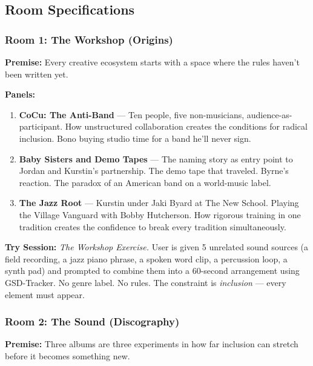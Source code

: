 \documentclass[11pt,letterpaper]{article}
\begin{document}
\subsection{Room Specifications}

\subsubsection{Room 1: The Workshop (Origins)}

\textbf{Premise:} Every creative ecosystem starts with a space where the rules haven't been written yet.

\textbf{Panels:}
\begin{enumerate}[leftmargin=2em]
\item \textbf{CoCu: The Anti-Band} --- Ten people, five non-musicians, audience-as-participant. How unstructured collaboration creates the conditions for radical inclusion. Bono buying studio time for a band he'll never sign.
\item \textbf{Baby Sisters and Demo Tapes} --- The naming story as entry point to Jordan and Kurstin's partnership. The demo tape that traveled. Byrne's reaction. The paradox of an American band on a world-music label.
\item \textbf{The Jazz Root} --- Kurstin under Jaki Byard at The New School. Playing the Village Vanguard with Bobby Hutcherson. How rigorous training in one tradition creates the confidence to break every tradition simultaneously.
\end{enumerate}

\textbf{Try Session:} \textit{The Workshop Exercise.} User is given 5 unrelated sound sources (a field recording, a jazz piano phrase, a spoken word clip, a percussion loop, a synth pad) and prompted to combine them into a 60-second arrangement using GSD-Tracker. No genre label. No rules. The constraint is \textit{inclusion} --- every element must appear.

\subsubsection{Room 2: The Sound (Discography)}

\textbf{Premise:} Three albums are three experiments in how far inclusion can stretch before it becomes something new.
\end{document}
